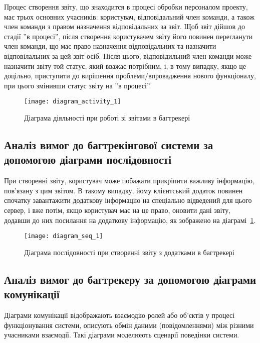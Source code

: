 \documentclass[../main.tex]{subfiles}
\begin{document}
	Процес створення звіту, що знаходится в процесі обробки персоналом проекту, має трьох основних учасників: користувач, відповідальний член команди, а також член команди з правом назначення відповідальних за звіт. Щоб звіт дійшов до стадії ''в процесі'', після створення користувачем звіту його повинен перегланути член команди, що має право назначення відповідальних та назначити відповілальних за цей звіт осіб. Після цього, відповідильний член команди може назначити звіту той статус, який вважає потрібним, і, в тому випадку, якщо це доцільно, приступити до вирішення проблеми/впровадження нового функціоналу, при цього змінивши статус звіту на ''в процесі''.
	
	\begin{figure}[H]
	\centering
	\texttt{[image: diagram\_activity\_1]}
	\caption{Діаграма діяльності при роботі зі звітами в багтрекері}
	\end{figure}
	
	\subsection{Аналіз вимог до багтрекінгової системи за допомогою діаграми послідовності}
	
	При створенні звіту, користувач може побажати прикріпити важливу інформацію, пов'язану з цим звітом. В такому випадку, йому клієнтський додаток повинен спочатку завантажити додаткову інформацію на спеціально відведений для цього сервер, і вже потім, якщо користувач має на це право, оновити дані звіту, додавши до них посилання на додаткову інформацію, як зображено на діаграмі~\ref{figure_diag_seq_1}.
	
	\begin{figure}[H]
		\centering
		\texttt{[image: diagram\_seq\_1]}
		\caption{Діаграма послідовності при створенні звіту з додатками в багтрекері}
		\label{figure_diag_seq_1}
	\end{figure}
	
	\subsection{Аналіз вимог до багтрекеру за допомогою діаграми комунікації}
	
	Діаграми комунікації відображають взаємодію ролей або об'єктів у процесі функціонування системи, описують обмін даними (повідомленнями) між різними учасниками взаємодії. Такі діаграми моделюють сценарії поведінки системи.~\cite{chnu_designing_systems}
	
\end{document}
